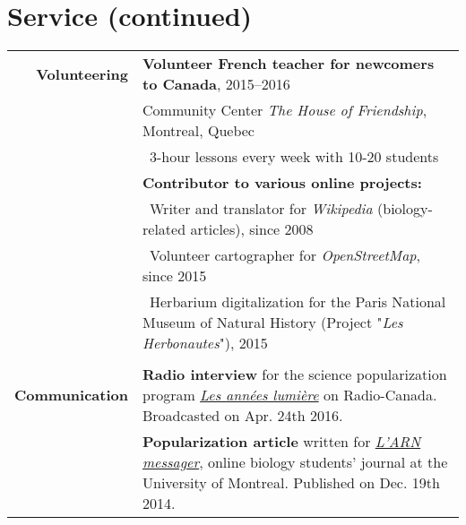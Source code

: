 \documentclass[letterpaper,10pt]{article}
\begin{document}
\section{Service \small{(continued)}}
\begin{tabular}{r|p{13.5cm}}

\textbf{Volunteering}

 & \textbf{Volunteer French teacher for newcomers to Canada}, 2015--2016 \\
 & Community Center \emph{The House of Friendship}, Montreal, Quebec \\
 & \textbullet{}~3-hour lessons every week with 10-20 students
   \vspace{2mm} \\

 & \textbf{Contributor to various online projects:} \\
 & \textbullet{}~Writer and translator for \emph{Wikipedia}
   (biology-related articles), since 2008 \\
 & \textbullet{}~Volunteer cartographer for \emph{OpenStreetMap},
   since 2015 \\
 & \textbullet{}~Herbarium digitalization for the Paris National Museum
   of Natural History (Project "\emph{Les Herbonautes}"), 2015 \\

\multicolumn{2}{c}{} \\

\textbf{Communication}

& \textbf{Radio interview} for the science popularization program
  \href{http://ici.radio-canada.ca/emissions/les_annees_lumiere/2009-2010/chronique.asp?idChronique=404672}{\emph{Les années lumière}} on Radio-Canada.
  Broadcasted on Apr. 24th 2016.
  \vspace{2mm} \\

& \textbf{Popularization article} written for
  \href{http://arnmessager.com/2014/12/19/les-mots-damour-des-plantes-a-fleurs/}
  {\emph{L'ARN messager}}, online biology students' journal at the
  University of Montreal. Published on Dec. 19th 2014. \\

\end{tabular}

\bigskip
\bigskip


\end{document}
